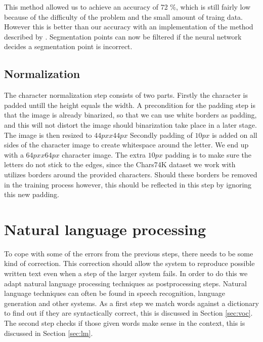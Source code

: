\documentclass{article}
\begin{document}
This method allowed us to achieve an accuracy of 72 \%, which is still fairly low because of the difficulty of the problem and the small amount of traing data. However this is better than our accuracy with an implementation of the method described by \citep{evalsplitpointsnn}. 
Segmentation points can now be filtered if the neural network decides a segmentation point is incorrect. 

\subsection{Normalization}
The character normalization step consists of two parts.
Firstly the character is padded untill the height equals the width.
A precondition for the padding step is that the image is already binarized, so that we can use white borders as padding, and this will not distort the image should binarization take place in a later stage.
The image is then resized to $44px x 44px$
Secondly padding of $10px$ is added on all sides of the character image to create whitespace around the letter.
We end up with a $64px x 64px$ character image.
The extra $10px$ padding is to make sure the letters do not stick to the edges, since the Chars74K dataset we work with utilizes borders around the provided characters. Should these borders be removed in the training process however, this should be reflected in this step by ignoring this new padding.

\section{Natural language processing}
\label{sec:postproc}

To cope with some of the errors from the previous steps, there needs to be some kind of correction. This correction should allow the system to reproduce possible written text even when a step of the larger system fails. 
In order to do this we adapt natural language processing techniques as postprocessing steps. Natural language techniques can often be found in speech recognition, language generation and other systems. 
As a first step we match words against a dictionary to find out if they are syntactically correct, this is discussed in Section \ref{sec:voc}. The second step checks if those given words make sense in the context, this is discussed in Section \ref{sec:lm}.
\end{document}
